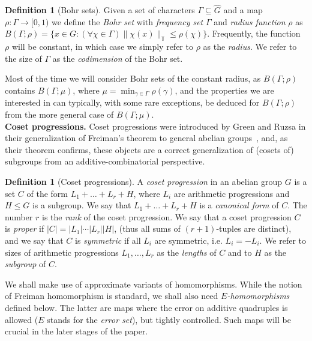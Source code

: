 \documentclass[a4paper,11pt]{article}
\numberwithin{theorem}{section}
\theoremstyle{definition}
\newtheorem{defin}[theorem]{Definition}
\newcommand{\tn}[1]{ %
	\|#1\|_{\mathbb{T}}
}
\begin{document}
\begin{defin}[Bohr sets]
    Given a set of characters $\Gamma \subseteq \hat{G}$ and a map $\rho : \Gamma \to [0, 1)$ we define the \emph{Bohr set} with \emph{frequency set} $\Gamma$ and \emph{radius function} $\rho$ as $B(\Gamma; \rho) = \{x \in G \colon (\forall \chi \in \Gamma) \tn{\chi(x)} \leq \rho(\chi)\}$. Frequently, the function $\rho$ will be constant, in which case we simply refer to $\rho$ as the \textit{radius}. We refer to the size of $\Gamma$ as the \textit{codimension} of the Bohr set. 
\end{defin}

Most of the time we will consider Bohr sets of the constant radius, as $B(\Gamma; \rho)$ contains $B(\Gamma; \mu)$, where $\mu = \min_{\gamma \in \Gamma} \rho(\gamma)$, and the properties we are interested in can typically, with some rare exceptions, be deduced for $B(\Gamma; \rho)$ from the more general case of $B(\Gamma; \mu)$.\\

\noindent \textbf{Coset progressions.}  Coset progressions were introduced by Green and Ruzsa in their generalization of Freiman's theorem to general abelian groups~\cite{greenRuzsaFreiman}, and, as their theorem confirms, these objects are a correct generalization of (cosets of) subgroups from an additive-combinatorial perspective.\\

\begin{defin}[Coset progressions]
    A \emph{coset progression} in an abelian group $G$ is a set $C$ of the form $L_1 + \dots + L_r + H$, where $L_i$ are arithmetic progressions and $H \leq G$ is a subgroup. We say that $L_1 + \dots + L_r + H$ is a \emph{canonical form} of $C$. The number $r$ is the \emph{rank} of the coset progression. We say that a coset progression $C$ is \emph{proper} if $|C| = |L_1| \cdots |L_r||H|$, (thus all sums of $(r + 1)$-tuples are distinct), and we say that $C$ is \emph{symmetric} if all $L_i$ are symmetric, i.e. $L_i = -L_i$. We refer to sizes of arithmetic progressions $L_1, \dots, L_r$ as the \textit{lengths} of $C$ and to $H$ as the \textit{subgroup} of $C$.
\end{defin}

We shall make use of approximate variants of homomorphisms. While the notion of Freiman homomorphism is standard, we shall also need \textit{$E$-homomorphisms} defined below. The latter are maps where the error on additive quadruples is allowed ($E$ stands for the \textit{error set}), but tightly controlled. Such maps will be crucial in the later stages of the paper. 
\end{document}
